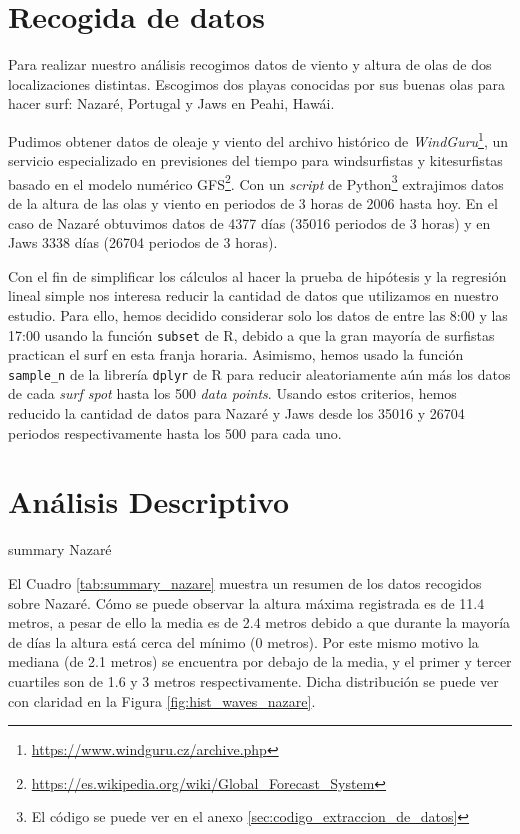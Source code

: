 \section{Recogida de datos}%
\label{sec:recogida_de_datos}
Para realizar nuestro análisis recogimos datos de viento y altura de olas de
dos localizaciones distintas. Escogimos dos playas conocidas por sus buenas
olas para hacer surf: Nazaré, Portugal y Jaws en Peahi, Hawái.

Pudimos obtener datos de oleaje y viento del archivo histórico de \emph{WindGuru}\footnote{\url{https://www.windguru.cz/archive.php}}, un servicio especializado en previsiones del tiempo para windsurfistas y kitesurfistas basado en el modelo numérico GFS\footnote{\url{https://es.wikipedia.org/wiki/Global_Forecast_System}}. Con un \textit{script} de
Python\footnote{El código se puede ver en el anexo
  \ref{sec:codigo_extraccion_de_datos}} extrajimos datos de la altura de las
olas y viento en periodos de 3 horas de 2006 hasta hoy. En el caso de Nazaré
obtuvimos datos de 4377 días (35016 periodos de 3 horas) y en Jaws 3338 días
(26704 periodos de 3 horas).

Con el fin de simplificar los cálculos al hacer la prueba de hipótesis y la regresión lineal simple nos interesa reducir la cantidad de datos que utilizamos en nuestro estudio. Para ello, hemos decidido considerar solo los datos de entre las 8:00 y las 17:00 usando la función \texttt{subset} de R, debido a que la gran mayoría de surfistas practican el surf en esta franja horaria. Asimismo, hemos usado la función \texttt{sample\_n} de la librería \texttt{dplyr} de R para reducir aleatoriamente aún más los datos de cada \textit{surf spot} hasta los 500 \textit{data points}. Usando estos criterios, hemos reducido la cantidad de datos para Nazaré y Jaws desde los 35016 y 26704 periodos respectivamente hasta los 500 para cada uno.

\section{Análisis Descriptivo}%
\label{sec:metodos}

\begin{table}[htbp]
    \centering
    
    \caption{summary Nazaré}
    \label{tab:summary_nazare}
\end{table}

El Cuadro \ref{tab:summary_nazare} muestra un resumen de los datos recogidos sobre Nazaré. Cómo se puede observar la altura máxima registrada es de 11.4 metros, a pesar de ello la media es de 2.4 metros debido a que durante la mayoría de días la altura está cerca del mínimo (0 metros). Por este mismo motivo la mediana (de 2.1 metros) se encuentra por debajo de la media, y el primer y tercer cuartiles son de 1.6 y 3 metros respectivamente. Dicha distribución se puede ver con claridad en la Figura \ref{fig:hist_waves_nazare}.

